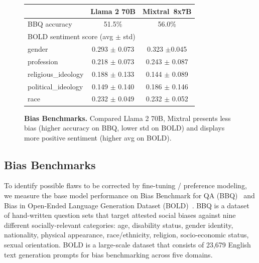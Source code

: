 \documentclass{article}
\def\llama{Llama\xspace}
\def\mixtral{Mixtral\xspace}
\def\mixtralEXSB{Mixtral~8x7B\xspace}
\begin{document}
\pagebreak
\setlength{\tabcolsep}{10pt}
\begin{figure}
\vspace{-10pt}
\small
\centering
    \begin{tabular}{@{}lcc@{}}
    \toprule
& \textbf{\llama 2 70B} & \textbf{\mixtralEXSB} \\ \midrule
    BBQ accuracy & 51.5\%              & 56.0\%  \\ 
    \midrule
\multicolumn{3}{l}{\hspace{-0.35cm}BOLD sentiment score (avg $\pm$ std) 
}
\\[3pt]  
    \footnotesize{gender}              & \footnotesize{0.293 $\pm$ 0.073}       & \footnotesize{0.323 $\pm$0.045}        \\[1pt]
    \footnotesize{profession}          & \footnotesize{0.218 $\pm$ 0.073}       & \footnotesize{0.243 $\pm$ 0.087}         \\[1pt]
    \footnotesize{religious\_ideology} & \footnotesize{0.188 $\pm$ 0.133}       & \footnotesize{0.144 $\pm$ 0.089}         \\[1pt]
    \footnotesize{political\_ideology} & \footnotesize{0.149 $\pm$ 0.140}       & \footnotesize{0.186 $\pm$ 0.146}         \\[1pt]
    \footnotesize{race}                & \footnotesize{0.232 $\pm$ 0.049}       & \footnotesize{0.232 $\pm$ 0.052}         \\ \bottomrule
    \end{tabular}
    \vspace{2pt}
    \caption{\small \textbf{Bias Benchmarks.} Compared \llama 2 70B, \mixtral presents less bias (higher accuracy on BBQ, lower std on BOLD) and displays more positive sentiment (higher avg on BOLD).}
    \label{tab:bias}
    \vspace{-10pt}
\end{figure}
\subsection{Bias Benchmarks} 

To identify possible flaws to be corrected by fine-tuning / preference modeling, we measure the base model performance on Bias Benchmark for QA (BBQ)~\cite{parrish2021bbq} and Bias in Open-Ended Language Generation Dataset (BOLD)~\cite{dhamala2021bold}.
BBQ is a dataset of hand-written question sets that target attested social biases against nine different socially-relevant categories: age, disability status, gender identity, nationality, physical appearance, race/ethnicity, religion, socio-economic status, sexual orientation. BOLD is a large-scale dataset that consists of 23,679 English text generation prompts for bias benchmarking across five domains.
\end{document}
